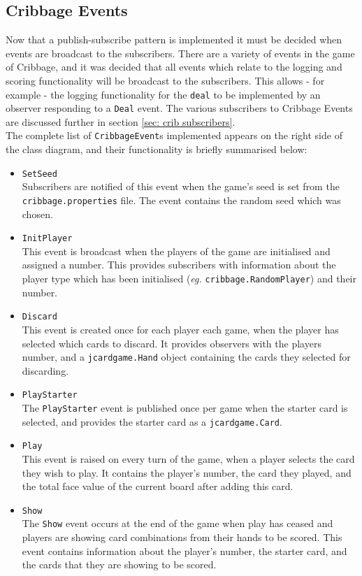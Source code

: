 \documentclass{article}
\begin{document}
\subsection{Cribbage Events}
Now that a publish-subscribe pattern is implemented it must be decided when events are broadcast to the subscribers. There are a variety of events in the game of Cribbage, and it was decided that all events which relate to the logging and scoring functionality will be broadcast to the subscribers. This allows - for example - the logging functionality for the \verb|deal| to be implemented by an observer responding to a \verb|Deal| event. The various subscribers to Cribbage Events are discussed further in section \ref{sec: crib subscribers}.\\[2mm]
The complete list of \verb|CribbageEvent|s implemented appears on the right side of the class diagram, and their functionality is briefly summarised below:
\begin{multicols}{2}
    \begin{itemize}
        \item \verb|SetSeed|\\[2mm]
        Subscribers are notified of this event when the game's seed is set from the \verb|cribbage.properties| file. The event contains the random seed which was chosen.
        \item \verb|InitPlayer|\\[2mm]
        This event is broadcast when the players of the game are initialised and assigned a number. This provides subscribers with information about the player type which has been initialised (\textit{eg.} \verb|cribbage.RandomPlayer|) and their number.
        \item \verb|Discard|\\[2mm]
        This event is created once for each player each game, when the player has selected which cards to discard. It provides observers with the players number, and a \verb|jcardgame.Hand| object containing the cards they selected for discarding.
        \item \verb|PlayStarter|\\[2mm]
        The \verb|PlayStarter| event is published once per game when the starter card is selected, and provides the starter card as a \verb|jcardgame.Card|.
        \item \verb|Play|\\[2mm]
        This event is raised on every turn of the game, when a player selects the card they wish to play. It contains the player's number, the card they played, and the total face value of the current board after adding this card.
        \item \verb|Show|\\[2mm]
        The \verb|Show| event occurs at the end of the game when play has ceased and players are showing card combinations from their hands to be scored. This event contains information about the player's number, the starter card, and the cards that they are showing to be scored.
    \end{itemize}
\end{multicols}
\end{document}
